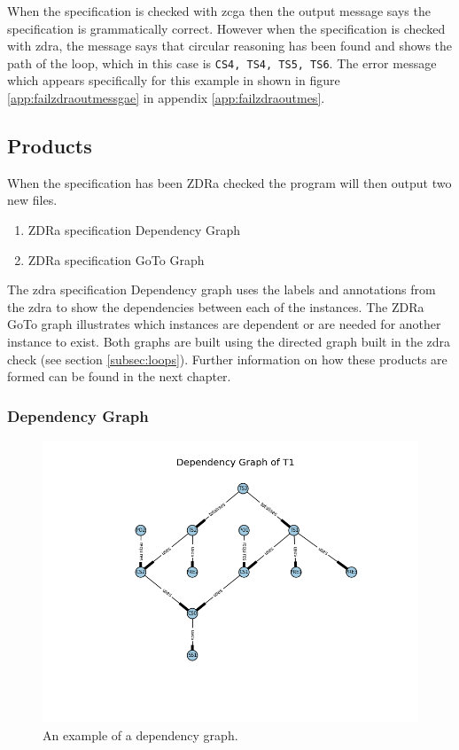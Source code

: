 When the specification is checked with \gls{zcga} then the output message says
the specification is grammatically correct. However when the specification is
checked with \gls{zdra}, the message says that circular reasoning has been found
and shows the path of the loop, which in this case is \verb|CS4, TS4, TS5, TS6|.
The error message which appears specifically for this example in shown in figure
\ref{app:failzdraoutmessgae} in appendix \ref{app:failzdraoutmes}.

\subsection{Products}
\label{subsec:zdra_prodcuts}

When the specification has been ZDRa checked the program will then output two
new files. 

\begin{enumerate}

\item ZDRa specification Dependency Graph

\item ZDRa specification GoTo Graph
\end{enumerate}

The \gls{zdra} specification Dependency graph uses the labels and annotations
from the \gls{zdra} to show the dependencies between each of the instances. The
ZDRa GoTo graph illustrates which instances are dependent or are needed for
another instance to exist. Both graphs are built using the directed graph built
in the \gls{zdra} check (see section \ref{subsec:loops}). Further information on
how these products are formed can be found in the next chapter.

\subsubsection{Dependency Graph}

\begin{figure}[H]
\centering
\includegraphics[scale=0.6]{Figures/zdra/depgraph.png}
\caption{An example of a dependency graph. \label{fig:depgraph}}
\end{figure}

